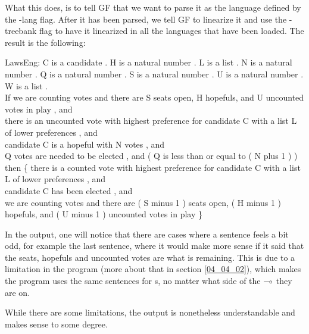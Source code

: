 What this does, is to tell GF that we want to parse it as the language defined by the -lang flag. After it has been parsed, we tell GF to linearize it  and use the -treebank flag to have it linearized in all the languages that have been loaded. The result is the following:

\begin{texto2}
LawsEng: C is a candidate . H is a natural number . L is a list . N is a natural number . Q is a natural number . S is a natural number . U is a natural number . W is a list .
\\ If we are counting votes and there are S seats open, H hopefuls, and U uncounted votes in play , and 
\\ there is an uncounted vote with highest preference for candidate C with a list L of lower preferences , and 
\\ candidate C is a hopeful with N votes , and 
\\ Q votes are needed to be elected , and ( Q is less than or equal to ( N plus 1 ) ) \\
then \{ there is a counted vote with highest preference for candidate C with a list L of lower preferences , and 
\\ candidate C has been elected , and 
\\ we are counting votes and there are ( S minus 1 ) seats open, ( H minus 1 ) hopefuls, and ( U minus 1 ) uncounted votes in play \}
\end{texto2}

In the output, one will notice that there are cases where a sentence feels a bit odd, for example the last sentence, where it would make more sense if it said that the seats, hopefuls and uncounted votes are what is remaining. This is due to a limitation in the program (more about that in section \ref{04_04_02}), which makes the program uses the same sentences for s, no matter what side of the $\multimap$ they are on.

While there are some limitations, the output is nonetheless understandable and makes sense to some degree.
